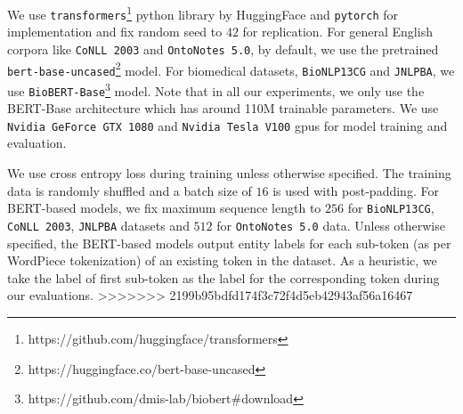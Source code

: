 We use \texttt{transformers}\footnote{https://github.com/huggingface/transformers} python library by HuggingFace and \texttt{pytorch} for implementation and fix random seed to $42$ for replication. For general English corpora like \texttt{CoNLL 2003} and \texttt{OntoNotes 5.0}, by default, we use the pretrained \texttt{bert-base-uncased}\footnote{https://huggingface.co/bert-base-uncased} model. For biomedical datasets, \texttt{BioNLP13CG} and \texttt{JNLPBA}, we use \texttt{BioBERT-Base}\footnote{https://github.com/dmis-lab/biobert\#download} model. Note that in all our experiments, we only use the BERT-Base architecture which has around 110M trainable parameters. We use \texttt{Nvidia GeForce GTX 1080} and \texttt{Nvidia Tesla V100} gpus for model training and evaluation.

We use cross entropy loss during training unless otherwise specified. The training data is randomly shuffled and a batch size of $16$ is used with post-padding. For BERT-based models, we fix maximum sequence length to $256$ for \texttt{BioNLP13CG}, \texttt{CoNLL 2003}, \texttt{JNLPBA} datasets and $512$ for \texttt{OntoNotes 5.0} data. Unless otherwise specified, the BERT-based models output entity labels for each sub-token (as per WordPiece tokenization) of an existing token in the dataset. As a heuristic, we take the label of first sub-token as the label for the corresponding token during our evaluations.
>>>>>>> 2199b95bdfd174f3c72f4d5eb42943af56a16467

